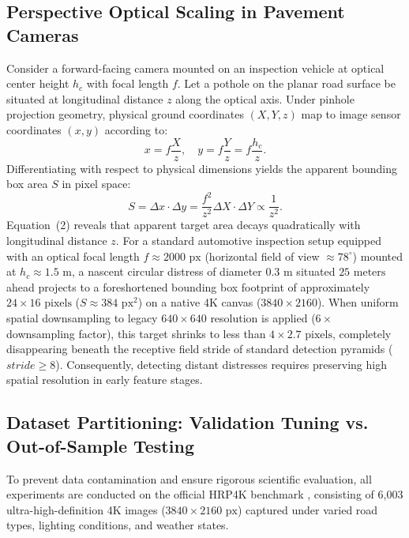\documentclass[runningheads]{llncs}
\begin{document}
\subsection{Perspective Optical Scaling in Pavement Cameras}
Consider a forward-facing camera mounted on an inspection vehicle at optical center height $h_c$ with focal length $f$. Let a pothole on the planar road surface be situated at longitudinal distance $z$ along the optical axis. Under pinhole projection geometry, physical ground coordinates $(X, Y, z)$ map to image sensor coordinates $(x, y)$ according to:
\begin{equation}
    x = f \frac{X}{z}, \quad y = f \frac{Y}{z} = f \frac{h_c}{z}.
\end{equation}
Differentiating with respect to physical dimensions yields the apparent bounding box area $S$ in pixel space:
\begin{equation}
    S = \Delta x \cdot \Delta y = \frac{f^2}{z^2} \Delta X \cdot \Delta Y \propto \frac{1}{z^2}.
\end{equation}
Equation~(2) reveals that apparent target area decays quadratically with longitudinal distance $z$. For a standard automotive inspection setup equipped with an optical focal length $f \approx 2000\text{ px}$ (horizontal field of view $\approx 78^\circ$) mounted at $h_c \approx 1.5\text{ m}$, a nascent circular distress of diameter $0.3\text{ m}$ situated $25\text{ meters}$ ahead projects to a foreshortened bounding box footprint of approximately $24 \times 16\text{ pixels}$ ($S \approx 384\text{ px}^2$) on a native 4K canvas ($3840 \times 2160$). When uniform spatial downsampling to legacy $640 \times 640$ resolution is applied ($6\times$ downsampling factor), this target shrinks to less than $4 \times 2.7\text{ pixels}$, completely disappearing beneath the receptive field stride of standard detection pyramids ($stride \ge 8$). Consequently, detecting distant distresses requires preserving high spatial resolution in early feature stages.

\subsection{Dataset Partitioning: Validation Tuning vs. Out-of-Sample Testing}
To prevent data contamination and ensure rigorous scientific evaluation, all experiments are conducted on the official HRP4K benchmark \cite{hrp4k_dataset}, consisting of 6,003 ultra-high-definition 4K images ($3840 \times 2160\text{ px}$) captured under varied road types, lighting conditions, and weather states.
\end{document}
